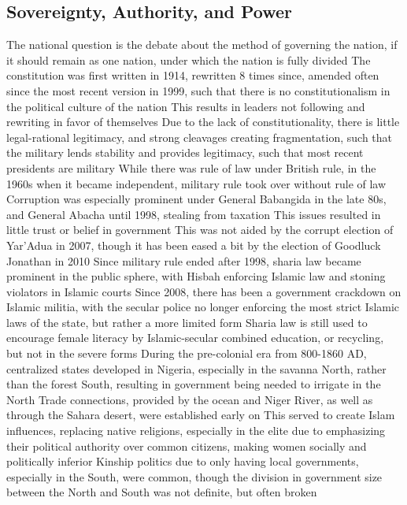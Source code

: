 \documentclass[11 pt, twoside]{article}
\newenvironment{outline*}
{
	\begin{outline}[enumerate]
	}
	{\end{outline}
}
\begin{document}
\subsection{Sovereignty, Authority, and Power}
\begin{outline*}
\1 The national question is the debate about the method of governing the nation, if it should remain as one nation, under which the nation is fully divided
\2 The constitution was first written in 1914, rewritten 8 times since, amended often since the most recent version in 1999, such that there is no constitutionalism in the political culture of the nation
\2 This results in leaders not following and rewriting in favor of themselves
\1 Due to the lack of constitutionality, there is little legal-rational legitimacy, and strong cleavages creating fragmentation, such that the military lends stability and provides legitimacy, such that most recent presidents are military
\2 While there was rule of law under British rule, in the 1960s when it became independent, military rule took over without rule of law
\3 Corruption was especially prominent under General Babangida in the late 80s, and General Abacha until 1998, stealing from taxation
\2 This issues resulted in little trust or belief in government
\3 This was not aided by the corrupt election of Yar'Adua in 2007, though it has been eased a bit by the election of Goodluck Jonathan in 2010
\2 Since military rule ended after 1998, sharia law became prominent in the public sphere, with Hisbah enforcing Islamic law and stoning violators in Islamic courts
\3 Since 2008, there has been a government crackdown on Islamic militia, with the secular police no longer enforcing the most strict Islamic laws of the state, but rather a more limited form
\3 Sharia law is still used to encourage female literacy by Islamic-secular combined education, or recycling, but not in the severe forms
\1 During the pre-colonial era from 800-1860 AD, centralized states developed in Nigeria, especially in the savanna North, rather than the forest South, resulting in government being needed to irrigate in the North
\2 Trade connections, provided by the ocean and Niger River, as well as through the Sahara desert, were established early on
\2 This served to create Islam influences, replacing native religions, especially in the elite due to emphasizing their political authority over common citizens, making women socially and politically inferior
\2 Kinship politics due to only having local governments, especially in the South, were common, though the division in government size between the North and South was not definite, but often broken

\end{outline*}
\end{document}

